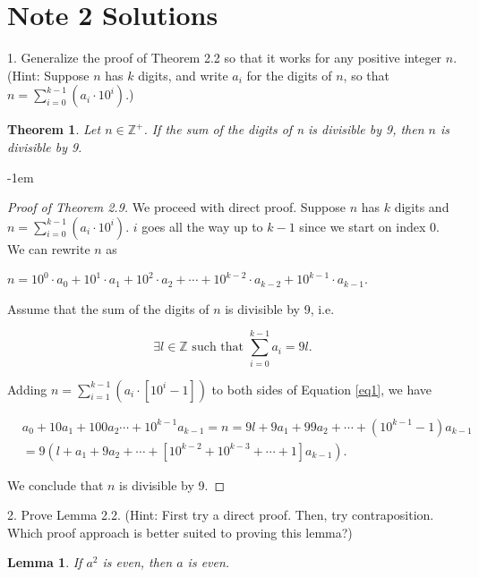 \documentclass[12pt,a4paper]{article}
\newtheorem{theorem}{Theorem}[section]
\newtheorem{lemma}{Lemma}[section]
\theoremstyle{definition}
\begin{document}
\raggedright

\section*{Note 2 Solutions}

1. Generalize the proof of Theorem 2.2 so that it works for any positive integer $n$. (Hint: Suppose $n$ has $k$ digits, and write $a_i$ for the digits of $n$, so that $n=\sum_{i=0}^{k-1}(a_i\cdot 10^i)$.)

\begin{theorem}
Let $n\in\mathbb{Z}^+$. If the sum of the digits of n is divisible by 9, then $n$ is divisible by 9.
\end{theorem}

\kern-1em
\color{red}
\begin{proof}[Proof of Theorem 2.9]
We proceed with direct proof. Suppose $n$ has $k$ digits and $n=\sum_{i=0}^{k-1}(a_i\cdot 10^i)$. $i$ goes all the way up to $k-1$ since we start on index 0. We can rewrite $n$ as
\begin{center}
$n=10^0\cdot a_0+10^1\cdot a_1+10^2\cdot a_2 + \cdots + 10^{k-2}\cdot a_{k-2} + 10^{k-1}\cdot a_{k-1}$.
\end{center}

Assume that the sum of the digits of $n$ is divisible by 9, i.e.

\begin{equation}\label{eq1}
\exists l\in\mathbb{Z} \text{ such that } \sum_{i=0}^{k-1}a_i=9l.
\end{equation}

Adding $n=\sum_{i=1}^{k-1}(a_i\cdot [10^i-1])$ to both sides of Equation \eqref{eq1}, we have

\begin{align*}
&a_0+10a_1+100a_2\cdots+10^{k-1}a_{k-1}=n=9l+9a_1+99a_2+\cdots+(10^{k-1}-1)a_{k-1} \\
&=9(l+a_1+9a_2+\cdots+[10^{k-2}+10^{k-3}+\cdots+1]a_{k-1}).
\end{align*}

We conclude that $n$ is divisible by 9.
\end{proof}

\color{black}
2. Prove Lemma 2.2. (Hint: First try a direct proof. Then, try contraposition. Which proof approach is better suited to proving this lemma?)

\begin{lemma}
If $a^2$ is even, then $a$ is even.
\end{lemma}
\end{document}
